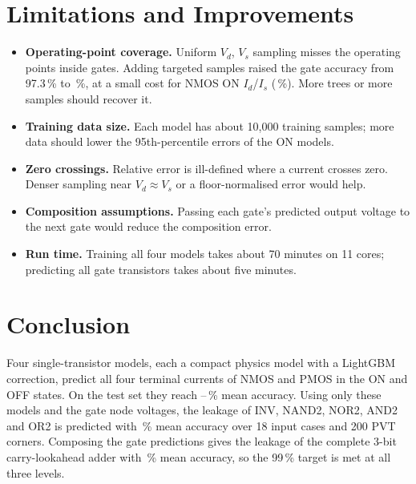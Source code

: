 \documentclass[12pt]{article}
\begin{document}
\section{Limitations and Improvements}
\begin{itemize}
    \item \textbf{Operating-point coverage.} Uniform $V_d$, $V_s$ sampling misses the operating
          points inside gates. Adding targeted samples raised the gate accuracy from 97.3\,\% to
          \GateMeanAcc\,\%, at a small cost for NMOS ON $I_d$/$I_s$ (\ModelMinAcc\,\%). More trees or
          more samples should recover it.
    \item \textbf{Training data size.} Each model has about 10{,}000 training samples; more data
          should lower the 95th-percentile errors of the ON models.
    \item \textbf{Zero crossings.} Relative error is ill-defined where a current crosses zero. Denser
          sampling near $V_d\approx V_s$ or a floor-normalised error would help.
    \item \textbf{Composition assumptions.} Passing each gate's predicted output voltage to the next
          gate would reduce the composition error.
    \item \textbf{Run time.} Training all four models takes about 70 minutes on 11 cores; predicting
          all gate transistors takes about five minutes.
\end{itemize}

\section{Conclusion}
Four single-transistor models, each a compact physics model with a LightGBM correction, predict
all four terminal currents of NMOS and PMOS in the ON and OFF states. On the test set they reach
\ModelMinAcc--\ModelMaxAcc\,\% mean accuracy. Using only these models and the gate node voltages,
the leakage of INV, NAND2, NOR2, AND2 and OR2 is predicted with \GateMeanAcc\,\% mean accuracy over
18 input cases and 200 PVT corners. Composing the gate predictions gives the leakage of the
complete 3-bit carry-lookahead adder with \ClaMeanAcc\,\% mean accuracy, so the 99\,\% target is
met at all three levels.
\end{document}
